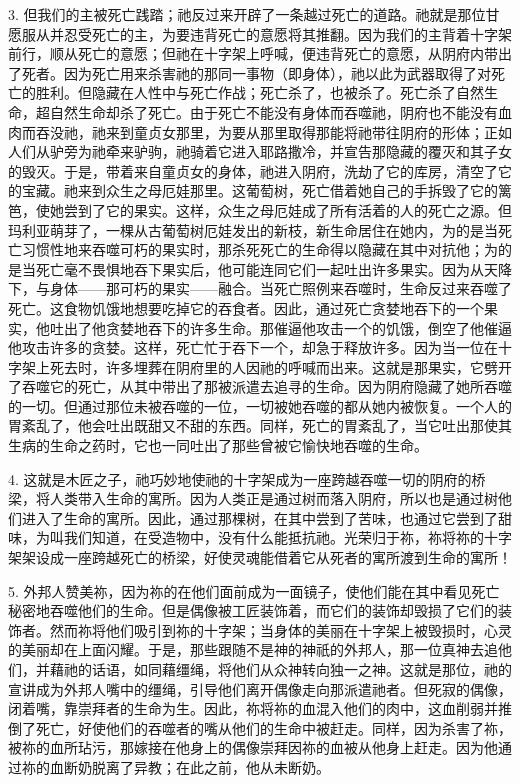 3. 但我们的主被死亡践踏；祂反过来开辟了一条越过死亡的道路。祂就是那位甘愿服从并忍受死亡的主，为要违背死亡的意愿将其推翻。因为我们的主背着十字架前行，顺从死亡的意愿；但祂在十字架上呼喊，便违背死亡的意愿，从阴府内带出了死者。因为死亡用来杀害祂的那同一事物（即身体），祂以此为武器取得了对死亡的胜利。但隐藏在人性中与死亡作战；死亡杀了，也被杀了。死亡杀了自然生命，超自然生命却杀了死亡。由于死亡不能没有身体而吞噬祂，阴府也不能没有血肉而吞没祂，祂来到童贞女那里，为要从那里取得那能将祂带往阴府的形体；正如人们从驴旁为祂牵来驴驹，祂骑着它进入耶路撒冷，并宣告那隐藏的覆灭和其子女的毁灭。于是，带着来自童贞女的身体，祂进入阴府，洗劫了它的库房，清空了它的宝藏。祂来到众生之母厄娃那里。这葡萄树，死亡借着她自己的手拆毁了它的篱笆，使她尝到了它的果实。这样，众生之母厄娃成了所有活着的人的死亡之源。但玛利亚萌芽了，一棵从古葡萄树厄娃发出的新枝，新生命居住在她内，为的是当死亡习惯性地来吞噬可朽的果实时，那杀死死亡的生命得以隐藏在其中对抗他；为的是当死亡毫不畏惧地吞下果实后，他可能连同它们一起吐出许多果实。因为从天降下，与身体——那可朽的果实——融合。当死亡照例来吞噬时，生命反过来吞噬了死亡。这食物饥饿地想要吃掉它的吞食者。因此，通过死亡贪婪地吞下的一个果实，他吐出了他贪婪地吞下的许多生命。那催逼他攻击一个的饥饿，倒空了他催逼他攻击许多的贪婪。这样，死亡忙于吞下一个，却急于释放许多。因为当一位在十字架上死去时，许多埋葬在阴府里的人因祂的呼喊而出来。这就是那果实，它劈开了吞噬它的死亡，从其中带出了那被派遣去追寻的生命。因为阴府隐藏了她所吞噬的一切。但通过那位未被吞噬的一位，一切被她吞噬的都从她内被恢复。一个人的胃紊乱了，他会吐出既甜又不甜的东西。同样，死亡的胃紊乱了，当它吐出那使其生病的生命之药时，它也一同吐出了那些曾被它愉快地吞噬的生命。\par

4. 这就是木匠之子，祂巧妙地使祂的十字架成为一座跨越吞噬一切的阴府的桥梁，将人类带入生命的寓所。因为人类正是通过树而落入阴府，所以也是通过树他们进入了生命的寓所。因此，通过那棵树，在其中尝到了苦味，也通过它尝到了甜味，为叫我们知道，在受造物中，没有什么能抵抗祂。光荣归于祢，祢将祢的十字架架设成一座跨越死亡的桥梁，好使灵魂能借着它从死者的寓所渡到生命的寓所！\par

5. 外邦人赞美祢，因为祢的在他们面前成为一面镜子，使他们能在其中看见死亡秘密地吞噬他们的生命。但是偶像被工匠装饰着，而它们的装饰却毁损了它们的装饰者。然而祢将他们吸引到祢的十字架；当身体的美丽在十字架上被毁损时，心灵的美丽却在上面闪耀。于是，那些跟随不是神的神祇的外邦人，那一位真神去追他们，并藉祂的话语，如同藉缰绳，将他们从众神转向独一之神。这就是那位，祂的宣讲成为外邦人嘴中的缰绳，引导他们离开偶像走向那派遣祂者。但死寂的偶像，闭着嘴，靠崇拜者的生命为生。因此，祢将祢的血混入他们的肉中，这血削弱并推倒了死亡，好使他们的吞噬者的嘴从他们的生命中被赶走。同样，因为杀害了祢，被祢的血所玷污，那嫁接在他身上的偶像崇拜因祢的血被从他身上赶走。因为他通过祢的血断奶脱离了异教；在此之前，他从未断奶。\par


